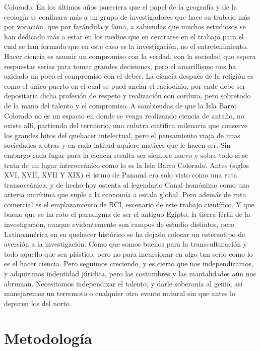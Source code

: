 \documentclass[11pt,]{article}
\begin{document}
Colorado. En los últimos años pareciera que el papel de la geografía y
de la ecología se confinara más a un grupo de investigadores que hace su
trabajo más por vocación, que por farándula y fama, a sabiendas que
muchos estudiosos se han dedicado más a estar en los medios que en
centrarse en el trabajo para el cual se han formado que en este caso es
la investigación, no el entretenimiento. Hacer ciencia es asumir un
compromiso con la verdad, con la sociedad que espera respuestas serias
para tomar grandes decisiones, pero el amarillismo nos ha oxidado un
poco el compromiso con el deber. La ciencia después de la religión es
como el único puerto en el cual se pued anclar el raciocinio, por ende
debe ser depositaria dicha profesión de respeto y realización con
cordura, pero sobretodo de la mano del talento y el compromiso. A
sambiendas de que la Isla Barro Colorado no es un espacio en donde se
venga realizando ciencia de antaño, no existe allí, partiendo del
territorio, una culutra cintífica milenaria que conserve los grandes
hitos del quehacer intelectual, pero el pensamiento viaja de unas
sociedades a otras y en cada latitud aquiere matices que le hacen ser.
Sin embargo cada lugar para la ciencia resulta ser siempre nuevo y sobre
todo si se trata de un lugar interoceánico como lo es la Isla Barro
Colorado. Antes (siglos XVI, XVII, XVII Y XIX) el istmo de Panamá era
solo visto como una ruta transoceánica, y de hecho hoy ostenta al
legendario Canal homónimo como una arteria marítima que suple a la
economía a escala global. Pero además de ruta comercial es el
emplazamiento de BCI, escenario de este trabajo científico. Y que bueno
que se ha roto el paradigma de ser el antiguo Egipto, la tierra fértil
de la investigación, aunque evidentemente son campos de estudio
distintos, pero Latinoamérica en su quehacer histórico se ha dejado
colocar un estereotipo de aversión a la investigación. Como que somos
buenos para la transculturación y todo aquello que sea plástico, pero no
para incursionar en algo tan serio como lo es el hacer ciencia. Pero
seguimos creciendo, y es cierto que nos independizamos, y adquirimos
indentidad júridica, pero las costumbres y las mantalidades aún nos
abruman. Necesitamos independizar el talento, y darle soberanía al
genio, así manejaremos un terremoto o cualquier otro evento natural sin
que antes lo depuren los del norte.

\section{Metodología}\label{metodologuxeda}
\end{document}

